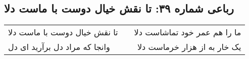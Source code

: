 \begin{center}
\section*{رباعی شماره ۳۹: تا نقش خیال دوست با ماست دلا}
\label{sec:0039}
\begin{longtable}{l p{0.5cm} r}
تا نقش خیال دوست با ماست دلا
&&
ما را هم عمر خود تماشاست دلا
\\
وانجا که مراد دل برآرید ای دل
&&
یک خار به از هزار خرماست دلا
\\
\end{longtable}
\end{center}
